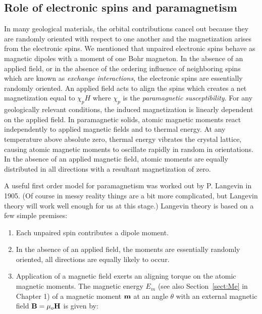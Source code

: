 {\subsection {Role of electronic spins and paramagnetism}
\label{sect:para}

In many geological materials, the orbital contributions cancel out because they are randomly oriented with respect to one another and the magnetization arises from the electronic spins.    We mentioned that unpaired electronic spins  behave as magnetic dipoles with a moment of one 
Bohr magneton. 
In the absence of an applied field, or in  the absence of the  
ordering influence of neighboring
spins which are known as 
%
{\it exchange interactions}, the electronic spins are essentially randomly oriented. 
An applied field acts to align the
spins which creates a net magnetization equal to $\chi_p H$ where  
%
$\chi_p$ is the {\it paramagnetic susceptibility}.  For
any geologically relevant conditions, the induced magnetization is linearly dependent on the applied field. In paramagnetic solids, atomic magnetic moments react independently to applied magnetic fields and to
thermal energy. At any temperature above absolute zero, thermal energy vibrates the crystal lattice, causing
atomic magnetic moments to oscillate rapidly in random in orientations. In the absence of an applied
magnetic field, atomic moments are equally distributed in all directions with  a resultant magnetization of zero.


A useful first order model for  paramagnetism was worked out by 
P. Langevin in 1905.   (Of course in messy reality things are a bit more complicated, but Langevin theory will work well enough for us at this stage.)
Langevin theory is based on a few simple
premises:


\begin{enumerate}

\item Each unpaired spin contributes a dipole moment. 

\item In the absence of an applied
field, the moments are essentially randomly oriented, \ie
all directions are equally likely to occur.

\item Application of a magnetic field exerts an aligning torque  on the atomic magnetic moments.  The 
magnetic energy $E_m$ (see also Section~\ref{sect:Me} in Chapter 1)  of a 
magnetic moment $\hbox{\bf m}$ at an angle $\theta$ with an external magnetic
 field $\hbox{\bf B}=\mu_o \hbox{\bf H}$ is given by:



\end{enumerate}}
